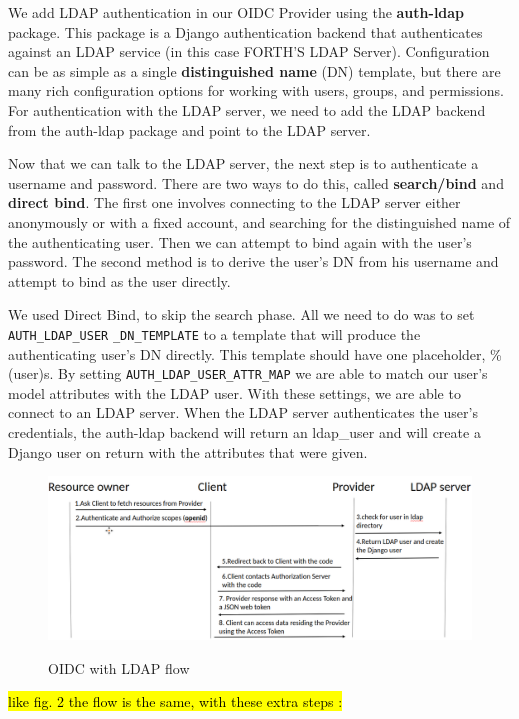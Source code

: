 We add LDAP authentication in our OIDC Provider using the \textbf{auth-ldap} \cite{ldapauth} package. This package is a Django authentication backend that authenticates against an LDAP service (in this case FORTH'S LDAP Server). Configuration can be as simple as a single \textbf{distinguished name} (DN) template, but there are many rich configuration options for working with users, groups, and permissions. For authentication with the LDAP server, we need to add the LDAP backend from the auth-ldap package and point to the LDAP server.

Now that we can talk to the LDAP server, the next step is to authenticate a username and password. There are two ways to do this, called \textbf{search/bind} and \textbf{direct bind}. The first one involves connecting to the LDAP server either anonymously or with a fixed account, and searching for the distinguished name of the authenticating user. Then we can attempt to bind again with the user’s password. The second method is to derive the user’s DN from his username and attempt to bind as the user directly.

We used Direct Bind, to skip the search phase. All we need to do was to set \verb|AUTH_LDAP_USER| \verb|_DN_TEMPLATE| to a template that will produce the authenticating user’s DN directly. This template should have one placeholder, \%(user)s. By setting \verb|AUTH_LDAP_USER_ATTR_MAP| we are able to match our user's model attributes with the LDAP user.
With these settings, we are able to connect to an LDAP server. When the LDAP server authenticates the user's credentials, the auth-ldap backend will return an ldap\_user and will create a Django user on return with the attributes that were given.

\begin{figure}[htb]
	\centering
	\includegraphics[scale=0.3]{figures/LDAP.png}\\
	\caption{OIDC with LDAP flow}
\end{figure}

\hl{like fig. 2 the flow is the same, with these extra steps :}

